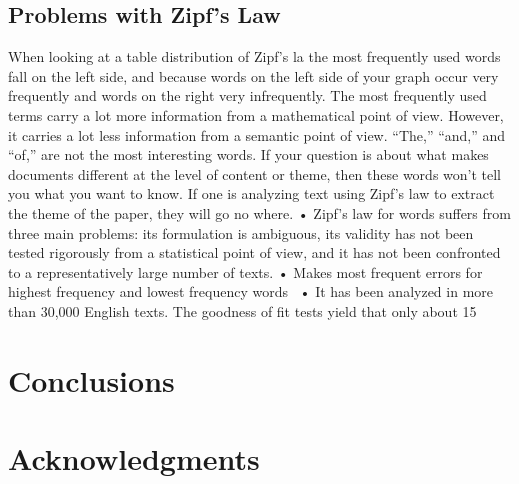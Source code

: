\documentclass[a4paper,10pt]{article}
\begin{document}
\subsection{Problems with Zipf's Law}

When looking at a table distribution of Zipf’s la the most frequently used words fall on the left side, and because words on the left side of your graph occur very frequently and words on the right very infrequently. The most frequently used terms carry a lot more information from a mathematical point of view. However, it carries a lot less information from a semantic point of view. “The,” “and,” and “of,” are not the most interesting words. If your question is about what makes documents different at the level of content or theme, then these words won’t tell you what you want to know. If one is analyzing text using Zipf’s law to extract the theme of the paper, they will go no where. 
• Zipf's law for words suffers from three main problems: its formulation is ambiguous, its validity has not been tested rigorously from a statistical point of view, and it has not been confronted to a representatively large number of texts.
• Makes most frequent errors for highest frequency and lowest frequency words 
• It has been analyzed in more than 30,000 English texts. The goodness of fit tests yield that only about 15%


\section{Conclusions}



\section*{Acknowledgments}




 
 
\end{document}
